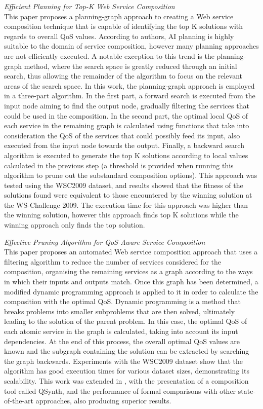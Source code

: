 \textit{Efficient Planning for Top-K Web Service Composition \cite{deng2013efficient}}\\
This paper proposes a planning-graph approach to creating a Web service composition technique that is capable of identifying the top K solutions with regards to
overall QoS values. According to authors, AI planning is highly suitable to the domain of service composition, however many planning approaches are not efficiently
executed. A notable exception to this trend is the planning-graph method, where the search space is greatly reduced through an initial search, thus allowing the
remainder of the algorithm to focus on the relevant areas of the search space. In this work, the planning-graph approach is employed in a three-part algorithm.
In the first part, a forward search is executed from the input node aiming to find the output node, gradually filtering the services that could be used in the
composition. In the second part, the optimal local QoS of each service in the remaining graph is calculated using functions that take into consideration the QoS
of the services that could possibly feed its input, also executed from the input node towards the output. Finally, a backward search algorithm is executed to
generate the top K solutions according to local values calculated in the previous step (a threshold is provided when running this algorithm to prune out the
substandard composition options). This approach was tested using the WSC2009 dataset, and results showed that the fitness of the solutions found were equivalent
to those encountered by the winning solution at the WS-Challenge 2009. The execution time for this approach was higher than the winning solution, however this
approach finds top K solutions while the winning approach only finds the top solution.

\textit{Effective Pruning Algorithm for QoS-Aware Service Composition \cite{huang2009effective}}\\
This paper proposes an automated Web service composition approach that uses a filtering algorithm to reduce the number of services considered for the
composition, organising the remaining services as a graph according to the ways in which their inputs and outputs match. Once this graph has been determined,
a modified dynamic programming approach is applied to it in order to calculate the composition with the optimal QoS. Dynamic programming is a method
that breaks problems into smaller subproblems that are then solved, ultimately leading to the solution of the parent problem. In this case, the optimal QoS
of each atomic service in the graph is calculated, taking into account its input dependencies. At the end of this process, the overall optimal QoS values are
known and the subgraph containing the solution can be extracted by searching the graph backwards. Experiments with the WSC2009 dataset show that the algorithm
has good execution times for various dataset sizes, demonstrating its scalability. This work was extended in \cite{jiang2010qsynth}, with the presentation of a composition tool
called QSynth, and the performance of formal comparisons with other state-of-the-art approaches, also producing superior results.

